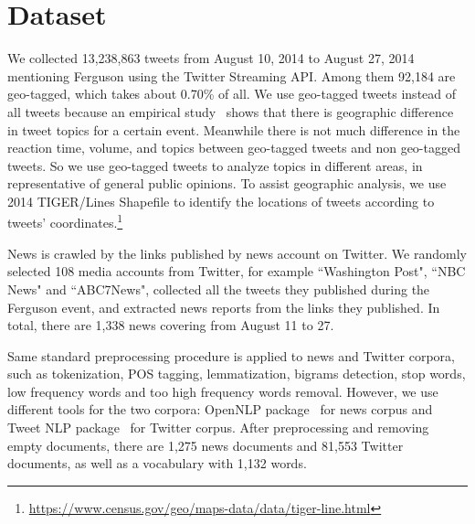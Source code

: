 \section{Dataset}
\label{sec:dat}

We collected 13,238,863 tweets from August 10, 2014 to August 27, 2014 mentioning Ferguson using the Twitter Streaming API. Among them 92,184 are geo-tagged, which takes about 0.70\% of all. We use geo-tagged tweets instead of all tweets because an empirical study~\cite{he2015uncovering} shows that there is geographic difference in tweet topics for a certain event. Meanwhile there is not much difference in the reaction time, volume, and topics between geo-tagged tweets and non geo-tagged tweets. So we use geo-tagged tweets to analyze topics in different areas, in representative of general public opinions. To assist geographic analysis, we use 2014 TIGER/Lines Shapefile to identify the locations of tweets according to tweets' coordinates.\footnote{\url{https://www.census.gov/geo/maps-data/data/tiger-line.html}}

News is crawled by the links published by news account on Twitter. We randomly selected 108 media accounts from Twitter, for example ``Washington Post", ``NBC News" and ``ABC7News", collected all the tweets they published during the Ferguson event, and extracted news reports from the links they published. In total, there are 1,338 news covering from August 11 to 27.

Same standard preprocessing procedure is applied to news and Twitter corpora, such as tokenization, POS tagging, lemmatization, bigrams detection, stop words, low frequency words and too high frequency words removal. However, we use different tools for the two corpora: OpenNLP package~\cite{baldridge2005opennlp} for news corpus and Tweet NLP package~\cite{owoputi2013improved} for Twitter corpus. After preprocessing and removing empty documents, there are 1,275 news documents and 81,553 Twitter documents, as well as a vocabulary with 1,132 words.







